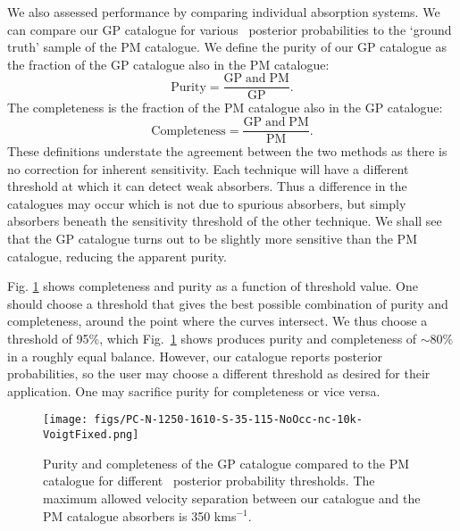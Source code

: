 \documentclass[fleqn,usenatbib]{mnras}
\newcommand{\civ}{\ion{C}{IV}}
\newcommand{\kms}{kms$^{-1}$} %
\begin{document}
We also assessed performance by comparing individual absorption systems. We can compare our GP catalogue for various \civ\ posterior probabilities to the `ground truth' sample of the PM catalogue.
We define the purity of our GP catalogue as the fraction of the GP catalogue also in the PM catalogue:
\begin{equation}
\mathrm{Purity} = \frac{\mathrm{GP\; and \;PM}}{\mathrm{GP}}.
\end{equation}
The completeness is the fraction of the PM catalogue also in the GP catalogue:
\begin{equation}
\mathrm{Completeness} = \frac{\mathrm{GP \;and \;PM}}{\mathrm{PM}}.
\end{equation}
These definitions understate the agreement between the two methods as there is no correction for inherent sensitivity. Each technique will have a different threshold at which it can detect weak absorbers. Thus a difference in the catalogues may occur which is not due to spurious absorbers, but simply absorbers beneath the sensitivity threshold of the other technique. We shall see that the GP catalogue turns out to be slightly more sensitive than the PM catalogue, reducing the apparent purity.

Fig. \ref{fig:threshold} shows completeness and purity as a function of threshold value.
One should choose a threshold that gives the best possible
combination of purity and completeness, around the point where the curves intersect.
We thus choose a threshold of 95\%, which Fig.~\ref{fig:threshold} shows produces purity and completeness of $\sim 80\%$ in a roughly equal balance.
However, our catalogue reports posterior probabilities, so the user may choose a different threshold as desired for their application. One may sacrifice purity for completeness or vice versa.

\begin{figure}
  \texttt{[image: figs/PC-N-1250-1610-S-35-115-NoOcc-nc-10k-VoigtFixed.png]}
  \caption{Purity and completeness of the GP catalogue compared to the PM catalogue for different \civ\ posterior probability thresholds.
  The maximum allowed velocity separation between our catalogue and the PM catalogue absorbers is 350 \kms.}
  \label{fig:threshold}
\end{figure}
\end{document}
